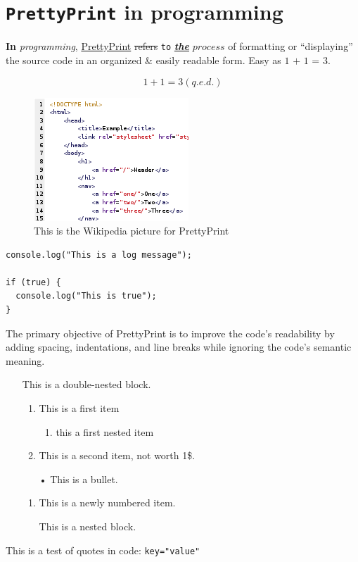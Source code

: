 \documentclass[12pt, a4paper]{article}
\makeatletter
\def\maxwidth#1{\ifdim\Gin@nat@width>#1 #1\else\Gin@nat@width\fi}
\makeatother
\begin{document}
\section{\texttt{PrettyPrint} in programming}
\textbf{In} \textit{programming}, \underline{PrettyPrint} \sout{refers} \texttt{to} \underline{\textbf{\textit{the}}} $process$ of formatting or \enquote{displaying} the source code in an organized \& easily readable form. 
 Easy as $\textit{1 + 1 = 3}$.

\begin{equation} 1 + 1 = 3 (q.e.d.)\end{equation}
\begin{figure}[h]
\includegraphics[width=\maxwidth{\linewidth}]{220px-HTML_source_code_example.png}
\centering
\caption{This is the Wikipedia picture for PrettyPrint}
\end{figure}
\begin{lstlisting}[caption=This is a sample code block with JavaScript syntax highlighting]
console.log("This is a log message");

if (true) {
  console.log("This is true");
}
\end{lstlisting}
The primary objective of PrettyPrint is to improve the code's readability by adding spacing, indentations, and line breaks while ignoring the code's semantic meaning.

\begin{itemize}
\item[ ] This is a double-nested block.

\begin{enumerate}
\item This is a first item
\begin{enumerate}
\item this a first nested item
\end{enumerate}
\item This is a second item, not worth 1\$.
\end{enumerate}
\begin{itemize}
\item[•] This is a bullet.
\end{itemize}
\begin{enumerate}
\item This is a newly numbered item.
\item[ ] This is a nested block.

\end{enumerate}
\end{itemize}
This is a test of quotes in code: \texttt{key="value"}
\end{document}
